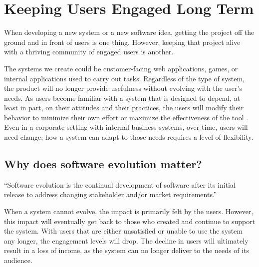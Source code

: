 
\section{Keeping Users Engaged Long Term} \label{sectionTheProblem}


When developing a new system or a new software idea, getting the project off the ground and in front of users is one thing. However, keeping that project alive with a thriving community of engaged users is another.

The systems we create could be customer-facing web applications, games, or internal applications used to carry out tasks. Regardless of the type of system, the product will no longer provide usefulness without evolving with the user's needs. As users become familiar with a system that is designed to depend, at least in part, on their attitudes and their practices, the users will modify their behavior to minimize their own effort or maximize the effectiveness of the tool \cite{lehman:1980}. Even in a corporate setting with internal business systems, over time, users will need change; how a system can adapt to those needs requires a level of flexibility.

\subsection{Why does software evolution matter?} \label{subWhySoftwareEvolution}

\vspace{0.25cm}
\begin{displayquote}
  ``Software evolution is the continual development of software after its initial release to address changing stakeholder and/or market requirements.'' \cite{wiki:software-evolution}
\end{displayquote}
\vspace{0.25cm}

When a system cannot evolve, the impact is primarily felt by the users. However, this impact will eventually get back to those who created and continue to support the system. With users that are either unsatisfied or unable to use the system any longer, the engagement levels will drop. The decline in users will ultimately result in a loss of income, as the system can no longer deliver to the needs of its audience.

